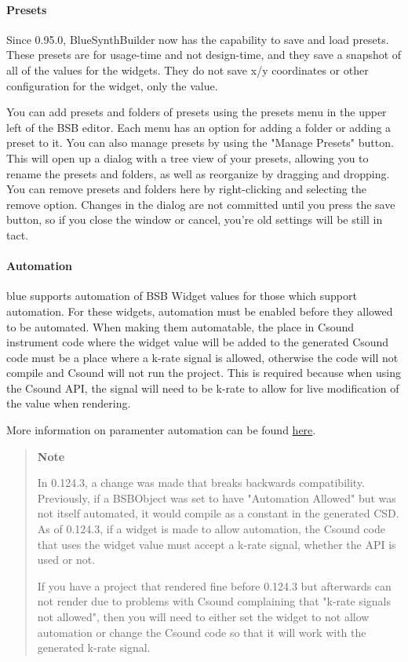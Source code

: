 \paragraph{Presets}

Since 0.95.0, BlueSynthBuilder now has the capability to save and load
presets. These presets are for usage-time and not design-time, and they
save a snapshot of all of the values for the widgets. They do not save
x/y coordinates or other configuration for the widget, only the value.

You can add presets and folders of presets using the presets menu in the
upper left of the BSB editor. Each menu has an option for adding a
folder or adding a preset to it. You can also manage presets by using
the "Manage Presets" button. This will open up a dialog with a tree view
of your presets, allowing you to rename the presets and folders, as well
as reorganize by dragging and dropping. You can remove presets and
folders here by right-clicking and selecting the remove option. Changes
in the dialog are not committed until you press the save button, so if
you close the window or cancel, you're old settings will be still in
tact.

\paragraph{Automation}\label{bsbAutomation}

blue supports automation of BSB Widget values for those which support
automation. For these widgets, automation must be enabled before they
allowed to be automated. When making them automatable, the place in
Csound instrument code where the widget value will be added to the
generated Csound code must be a place where a k-rate signal is allowed,
otherwise the code will not compile and Csound will not run the project.
This is required because when using the Csound API, the signal will need
to be k-rate to allow for live modification of the value when rendering.

More information on paramenter automation can be found
\protect\hyperlink{parameterAutomation}{here}.

\begin{quote}
\textbf{Note}

In 0.124.3, a change was made that breaks backwards compatibility.
Previously, if a BSBObject was set to have "Automation Allowed" but was
not itself automated, it would compile as a constant in the generated
CSD. As of 0.124.3, if a widget is made to allow automation, the Csound
code that uses the widget value must accept a k-rate signal, whether the
API is used or not.

If you have a project that rendered fine before 0.124.3 but afterwards
can not render due to problems with Csound complaining that "k-rate
signals not allowed", then you will need to either set the widget to not
allow automation or change the Csound code so that it will work with the
generated k-rate signal.
\end{quote}


